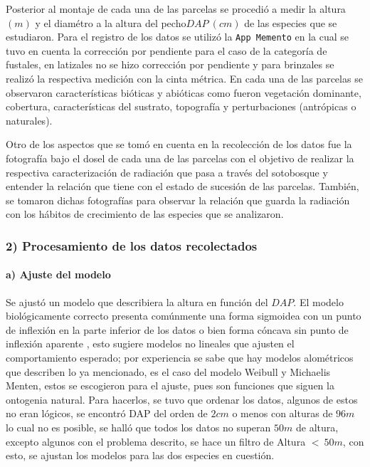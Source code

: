 \documentclass[letterpaper,9pt,onecolumn,twoside,]{pinp}
\begin{document}
Posterior al montaje de cada una de las parcelas se procedió a medir la
altura \((m)\) y el diamétro a la altura del pecho\(DAP \ (cm)\) de las 
especies que se estudiaron. Para
el registro de los datos se utilizó la \texttt{App\ Memento} en la cual
se tuvo en cuenta la corrección por pendiente para el caso de la
categoría de fustales, en latizales no se hizo
corrección por pendiente y para brinzales se realizó la
respectiva medición con la cinta métrica. En cada una de las parcelas se
observaron características bióticas y abióticas como fueron
vegetación dominante, cobertura, características del sustrato, topografía y
perturbaciones (antrópicas o naturales).

Otro de los aspectos que se tomó en cuenta en la recolección de los
datos fue la fotografía bajo el dosel de cada una de las parcelas
con el objetivo de realizar la respectiva caracterización de radiación
que pasa a través del sotobosque y entender la relación que tiene con el
estado de sucesión de las parcelas. También, se tomaron dichas
fotografías para observar la relación que guarda la radiación con los
hábitos de crecimiento de las especies que se analizaron.

\hypertarget{procesamiento-de-los-datos-recolectados}{%
\subsubsection{2) Procesamiento de los datos
recolectados}\label{procesamiento-de-los-datos-recolectados}}

\hypertarget{a-ajuste-del-modelo}{%
\paragraph{a) Ajuste del modelo}\label{a-ajuste-del-modelo}}

Se ajustó un modelo que describiera la altura en función del \(DAP\). El
modelo biológicamente correcto presenta comúnmente una forma sigmoidea
con un punto de inflexión en la parte inferior de los datos o bien forma
cóncava sin punto de inflexión aparente \citep{huan}, esto sugiere
modelos no lineales que ajusten el comportamiento esperado; por
experiencia se sabe que hay modelos alométricos que describen lo ya
mencionado, es el caso del modelo Weibull y Michaelis Menten, estos se
escogieron para el ajuste, pues son funciones que siguen la ontogenia
natural. Para hacerlos, se tuvo que ordenar los datos, algunos de estos
no eran lógicos, se encontró DAP del orden de \(2cm\) o menos con
alturas de \(96 m\) lo cual no es posible, se halló que todos los datos
no superan \(50 m\) de altura, excepto algunos con el problema descrito,
se hace un filtro de Altura \(< \ 50 m\), con esto, se ajustan los
modelos para las dos especies en cuestión.
\end{document}
